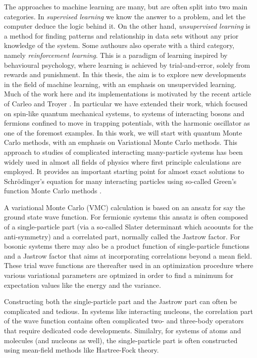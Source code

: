 \documentclass[twoside,english]{uiofysmaster}
\begin{document}
The approaches to machine learning are many, but are often split into
two main categories.  In {\em supervised learning} we know the answer
to a problem, and let the computer deduce the logic behind it. On the
other hand, {\em unsupervised learning} is a method for finding
patterns and relationship in data sets without any prior knowledge of
the system.  Some authours also operate with a third category, namely
{\em reinforcement learning}. This is a paradigm of learning inspired
by behavioural psychology, where learning is achieved by
trial-and-error, solely from rewards and punishment.  In this thesis,
the aim is to explore new developments in the field of machine 
learning, with an emphasis on unsupervided learning. Much of the work
here and its implementations is motivated by the recent article of
Carleo and Troyer \cite{Carleo2017}. In particular we have extended
their work, which focused on spin-like quantum mechanical systems, to
systems of interacting bosons and fermions confined to move in
trapping potentials, with the harmonic oscillator as one of the
foremost examples.  
In this work, we will start with quantum Monte Carlo methods,
with an emphasis on Variational Monte Carlo methods.  This approach to
studies of complicated interacting many-particle systems has been
widely used in almost all fields of physics where first principle calculations are 
employed. It provides an important starting  point
for almost exact solutions to Schr\"odinger's equation for many
interacting particles using so-called Green's function Monte Carlo methods \cite{Hammond1994}.

A variational Monte Carlo (VMC) calculation is based on an ansatz for
say the ground state wave function.  For fermionic systems this ansatz
is often composed of a single-particle part (via a so-called Slater
determinant which acoounts for the anti-symmetry) and a correlated
part, normally called the Jastrow factor.  For bosonic systems there
may also be a product function of single-particle functions and a
Jastrow factor that aims at incorporating correlations beyond a mean
field.  These trial wave functions are thereafter used in an
optimization procedure where various variational parameters are
optmized in order to find a minimum for expectation values like the
energy and the variance.

Constructing both the single-particle part and the Jastrow part can
often be complicated and tedious.  In systems like interacting
nucleons, the correlation part of the wave function contains often
complicated two- and three-body operators that require dedicated code
developments. Similalry, for systems of atoms and molecules (and
nucleons as well), the single-particle part is often constructed using
mean-field methods like Hartree-Fock theory.
\end{document}
